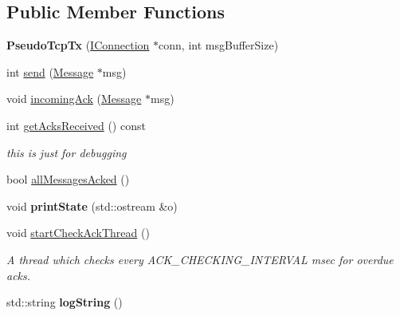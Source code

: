 \subsection*{Public Member Functions}
\begin{DoxyCompactItemize}
\item 
\hypertarget{classPseudoTcp_1_1PseudoTcpTx_ac4a27695a1df46604d3b0b7b5e7a8626}{
{\bfseries PseudoTcpTx} (\hyperlink{classPseudoTcp_1_1IConnection}{IConnection} $\ast$conn, int msgBufferSize)}
\label{classPseudoTcp_1_1PseudoTcpTx_ac4a27695a1df46604d3b0b7b5e7a8626}

\item 
int \hyperlink{classPseudoTcp_1_1PseudoTcpTx_a647b783fb072921aa4451ee887644e34}{send} (\hyperlink{classPseudoTcp_1_1Message}{Message} $\ast$msg)
\item 
void \hyperlink{classPseudoTcp_1_1PseudoTcpTx_ab947a8457582a5647828bddaebca86a9}{incomingAck} (\hyperlink{classPseudoTcp_1_1Message}{Message} $\ast$msg)
\item 
\hypertarget{classPseudoTcp_1_1PseudoTcpTx_a9b3a72a495ab645207459d4cc6ebbdc2}{
int \hyperlink{classPseudoTcp_1_1PseudoTcpTx_a9b3a72a495ab645207459d4cc6ebbdc2}{getAcksReceived} () const }
\label{classPseudoTcp_1_1PseudoTcpTx_a9b3a72a495ab645207459d4cc6ebbdc2}

\begin{DoxyCompactList}\small\item\em this is just for debugging \item\end{DoxyCompactList}\item 
bool \hyperlink{classPseudoTcp_1_1PseudoTcpTx_a0285cf3faab1f34b97360bc9f4e68a77}{allMessagesAcked} ()
\item 
\hypertarget{classPseudoTcp_1_1PseudoTcpTx_a988c36108dc7eb80f8eeef220b78e5b8}{
void {\bfseries printState} (std::ostream \&o)}
\label{classPseudoTcp_1_1PseudoTcpTx_a988c36108dc7eb80f8eeef220b78e5b8}

\item 
\hypertarget{classPseudoTcp_1_1PseudoTcpTx_a3b36d6b9941b313755a9b099a6d0f077}{
void \hyperlink{classPseudoTcp_1_1PseudoTcpTx_a3b36d6b9941b313755a9b099a6d0f077}{startCheckAckThread} ()}
\label{classPseudoTcp_1_1PseudoTcpTx_a3b36d6b9941b313755a9b099a6d0f077}

\begin{DoxyCompactList}\small\item\em A thread which checks every ACK\_\-CHECKING\_\-INTERVAL msec for overdue acks. \item\end{DoxyCompactList}\item 
\hypertarget{classPseudoTcp_1_1PseudoTcpTx_a16e082eff985c8f985aa860dc2bc51e6}{
std::string {\bfseries logString} ()}
\label{classPseudoTcp_1_1PseudoTcpTx_a16e082eff985c8f985aa860dc2bc51e6}


\end{DoxyCompactItemize}
